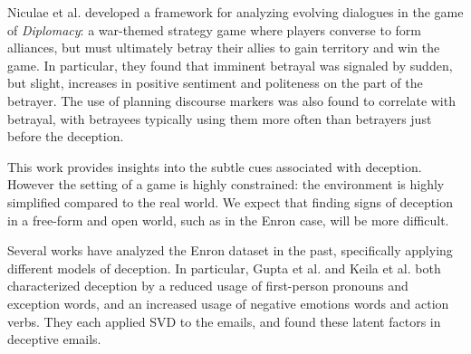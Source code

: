 
Niculae et al. \cite{diplomacy} developed a framework for analyzing evolving dialogues in the game of \textit{Diplomacy}: a war-themed strategy game where players converse to form alliances, but must ultimately betray their allies to gain territory and win the game. In particular, they found that imminent betrayal was signaled by sudden, but slight, increases in positive sentiment and politeness on the part of the betrayer. The use of planning discourse markers was also found to correlate with betrayal, with betrayees typically using them more often than betrayers just before the deception.


This work provides insights into the subtle cues associated with deception. However the setting of a game is highly constrained: the environment is highly simplified compared to the real world. We expect that finding signs of deception in a free-form and open world, such as in the Enron case, will be more difficult. 


Several works have analyzed the Enron dataset in the past, specifically applying different models of deception. In particular, Gupta et al. \cite{enron_deception_gupta} and Keila et al. \cite{enron_deception_keila} both characterized deception by a reduced usage of first-person pronouns and exception words, and an increased usage of negative emotions words and action verbs. They each applied SVD to the emails, and found these latent factors in deceptive emails.

